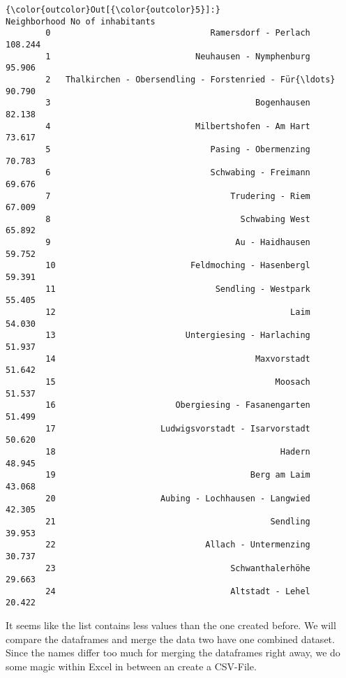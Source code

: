 \documentclass[11pt]{article}
\begin{document}
\begin{Verbatim}[commandchars=\\\{\}]
{\color{outcolor}Out[{\color{outcolor}5}]:}                                          Neighborhood No of inhabitants
        0                                Ramersdorf - Perlach           108.244
        1                             Neuhausen - Nymphenburg            95.906
        2   Thalkirchen - Obersendling - Forstenried - Für{\ldots}            90.790
        3                                         Bogenhausen            82.138
        4                             Milbertshofen - Am Hart            73.617
        5                                Pasing - Obermenzing            70.783
        6                                Schwabing - Freimann            69.676
        7                                    Trudering - Riem            67.009
        8                                      Schwabing West            65.892
        9                                     Au - Haidhausen            59.752
        10                           Feldmoching - Hasenbergl            59.391
        11                                Sendling - Westpark            55.405
        12                                               Laim            54.030
        13                          Untergiesing - Harlaching            51.937
        14                                        Maxvorstadt            51.642
        15                                            Moosach            51.537
        16                        Obergiesing - Fasanengarten            51.499
        17                     Ludwigsvorstadt - Isarvorstadt            50.620
        18                                             Hadern            48.945
        19                                       Berg am Laim            43.068
        20                     Aubing - Lochhausen - Langwied            42.305
        21                                           Sendling            39.953
        22                              Allach - Untermenzing            30.737
        23                                   Schwanthalerhöhe            29.663
        24                                   Altstadt - Lehel            20.422
\end{Verbatim}
            
    It seems like the list contains less values than the one created before.
We will compare the dataframes and merge the data two have one combined
dataset. Since the names differ too much for merging the dataframes
right away, we do some magic within Excel in between an create a
CSV-File.
\end{document}
